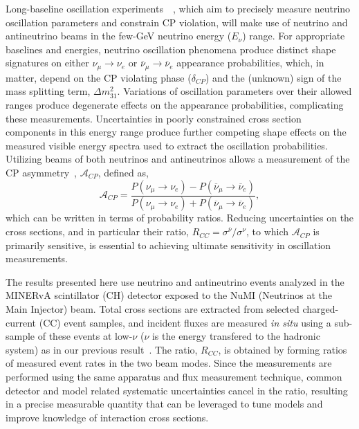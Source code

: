 \documentclass[aps,preprint,showpacs,superscriptaddress,linenumbers,nofootinbib,prd,12pt]{revtex4}
\newcommand{\minerva}{MINERvA\xspace}
\newcommand{\ratio}{\ensuremath{R_{CC}}}
\begin{document}
Long-baseline oscillation experiments~\cite{Acciarri:2015uup}~\cite{Abe:2015zbg}, which aim to precisely measure neutrino oscillation parameters 
and constrain CP violation, will make use of neutrino and antineutrino beams 
in the few-GeV neutrino energy ($E_\nu$) range.
For appropriate baselines and energies, neutrino oscillation phenomena produce distinct shape signatures on 
either  $\nu_\mu \rightarrow \nu_e$  or  $\overline{\nu}_\mu \rightarrow \overline{\nu}_e$ appearance probabilities, which,
in matter, depend on the CP violating phase ($\delta_{CP}$) and the (unknown) sign of the mass splitting term, $\Delta m^2_{31}$.
Variations of oscillation parameters over their allowed ranges produce degenerate effects on the appearance probabilities, complicating
these measurements. 
Uncertainties in poorly constrained cross section components in this energy range produce further competing shape 
effects on the measured visible energy spectra used to extract the oscillation probabilities. 
Utilizing beams of both neutrinos and antineutrinos allows a measurement of the CP asymmetry~\cite{Marciano:2006uc}, $\mathcal{A}_{CP}$, defined as,
\begin{equation}
\mathcal{A}_{CP}=\frac{P(\nu_\mu \rightarrow \nu_e) - P(\overline{\nu}_\mu \rightarrow \overline{\nu}_e)}
{P(\nu_\mu \rightarrow \nu_e) + P(\overline{\nu}_\mu \rightarrow \overline{\nu}_e)},
\label{eq:cp_asymmetry}
\end{equation}
which can be written in terms of probability ratios.
Reducing uncertainties on the cross sections, and in particular their ratio,
$\ratio=\sigma^{\overline{\nu}}/\sigma^{\nu}$, to which $\mathcal{A}_{CP}$ is primarily sensitive, is 
essential to achieving ultimate sensitivity in oscillation measurements.

The results presented here use neutrino and antineutrino events analyzed in 
the \minerva scintillator (CH) detector 
exposed to the NuMI (Neutrinos at the Main Injector) beam.
Total cross sections are extracted from selected charged-current (CC) event samples, and incident fluxes are measured  {\it in situ}
using a sub-sample of these events at low-$\nu$ ($\nu$ is the energy transfered to the hadronic system) as in our previous result~\cite{DeVan:2016rkm}. 
The ratio, \ratio{},
is obtained by forming ratios of measured event rates in the two beam modes.
Since the measurements are performed using 
the same apparatus and flux measurement technique, 
common detector and model related systematic uncertainties cancel in the 
ratio, resulting in a precise measurable quantity that can be leveraged to 
tune models and improve knowledge of interaction cross sections.
\end{document}
